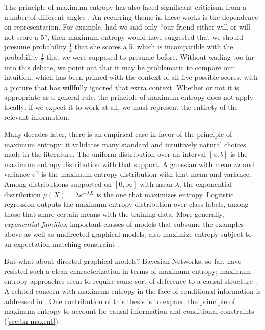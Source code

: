 The principle of maximum entropy has also faced significant criticism, from a number of different angles \citep{seidenfeld1986entropy,critique-maxent,friedman1971jaynes}.
An recurring theme in these works is the dependence on representation.
For example, had we said only 
``our friend either will or will not score a 5'', 
then maximum entropy would have suggested that we should presume probability $\frac12$ that she scores a 5, which is incompatible with the probability $\frac15$ that we were supposed to presume before. 
%
Without wading too far into this debate, we point out that it may be problematic to compare our intuition, which has been primed with the context of all five possible scores, with a picture that has willfully ignored that extra context. 
Whether or not it is appropriate as a general rule, the principle of maximum entropy does not apply locally; if we expect it to work at all, we must represent the entirety of the relevant information. 


Many decades later, there is an empirical case in favor of the principle of maximum entropy: it validates many standard and intuitively natural choices made in the literature.
The uniform distribution over an interval $[a,b]$ is the maximum entropy distribution with that support. 
A gaussian with mean $m$ and variance $\sigma^2$ is the maximum entropy distribution with that mean and variance. 
Among distributions supported on $[0,\infty]$ with mean $\lambda$, the exponential distribution $\mu(X) = \lambda e^{-\lambda X}$ is the one that maximizes entropy. 
Logitstic regression 
    outputs the maximum entropy distribution over class labels,
    among those that share certain means with the training data.
More generally, \emph{exponential families}, important classes of models that subsume the examples above as well as undirected graphical models, also maximize entropy subject to an expectation matching constraint
    \citep[\S3.1]{wainwright2008graphical}. 

But what about directed graphical models? Bayesian Networks, so far, have resisted such a clean characterization in terms of maximum entropy; maximum entropy approaches seem to require some sort of deference to a causal structure \citep{williamson2001foundations}. 
A related concern with maximum entropy in the face of conditional information is addressed in \citep{Grove1997ProbabilityUC}.
One contribution of this thesis is to expand the principle of maximum entropy to account for causal information and conditional constraints (\cref{sec:bn-maxent}). 
%


